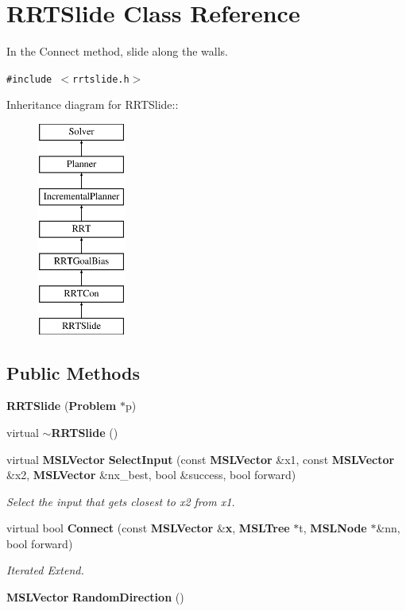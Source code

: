 \section{RRTSlide  Class Reference}
\label{classRRTSlide}
In the Connect method, slide along the walls. 


{\tt \#include $<$rrtslide.h$>$}

Inheritance diagram for RRTSlide::\begin{figure}[H]
\begin{center}
\leavevmode
\includegraphics[height=7cm]{classRRTSlide}
\end{center}
\end{figure}
\subsection*{Public Methods}
\begin{CompactItemize}
\item 
{\bf RRTSlide} ({\bf Problem} $\ast$p)
\item 
virtual {\bf $\sim$RRTSlide} ()
\item 
virtual {\bf MSLVector} {\bf Select\-Input} (const {\bf MSLVector} \&x1, const {\bf MSLVector} \&x2, {\bf MSLVector} \&nx\_\-best, bool \&success, bool forward)
\begin{CompactList}\small\item\em Select the input that gets closest to x2 from x1.\item\end{CompactList}\item 
virtual bool {\bf Connect} (const {\bf MSLVector} \&{\bf x}, {\bf MSLTree} $\ast$t, {\bf MSLNode} $\ast$\&nn, bool forward)
\begin{CompactList}\small\item\em Iterated Extend.\item\end{CompactList}\item 
{\bf MSLVector} {\bf Random\-Direction} ()
\end{CompactItemize}
